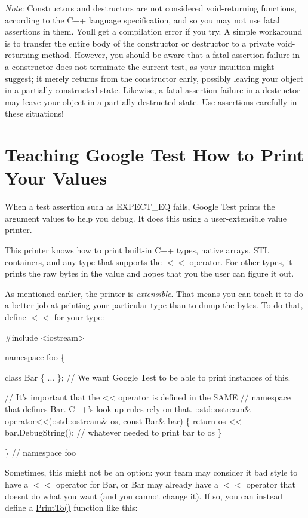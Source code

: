 {\itshape Note}\+: Constructors and destructors are not considered void-\/returning functions, according to the C++ language specification, and so you may not use fatal assertions in them. You\textquotesingle{}ll get a compilation error if you try. A simple workaround is to transfer the entire body of the constructor or destructor to a private void-\/returning method. However, you should be aware that a fatal assertion failure in a constructor does not terminate the current test, as your intuition might suggest; it merely returns from the constructor early, possibly leaving your object in a partially-\/constructed state. Likewise, a fatal assertion failure in a destructor may leave your object in a partially-\/destructed state. Use assertions carefully in these situations!

\section*{Teaching Google Test How to Print Your Values}

When a test assertion such as {\ttfamily E\+X\+P\+E\+C\+T\+\_\+\+EQ} fails, Google Test prints the argument values to help you debug. It does this using a user-\/extensible value printer.

This printer knows how to print built-\/in C++ types, native arrays, S\+TL containers, and any type that supports the {\ttfamily $<$$<$} operator. For other types, it prints the raw bytes in the value and hopes that you the user can figure it out.

As mentioned earlier, the printer is {\itshape extensible}. That means you can teach it to do a better job at printing your particular type than to dump the bytes. To do that, define {\ttfamily $<$$<$} for your type\+:


\begin{DoxyCode}
#include <iostream>

namespace foo \{

class Bar \{ ... \};  // We want Google Test to be able to print instances of this.

// It's important that the << operator is defined in the SAME
// namespace that defines Bar.  C++'s look-up rules rely on that.
::std::ostream& operator<<(::std::ostream& os, const Bar& bar) \{
  return os << bar.DebugString();  // whatever needed to print bar to os
\}

\}  // namespace foo
\end{DoxyCode}


Sometimes, this might not be an option\+: your team may consider it bad style to have a {\ttfamily $<$$<$} operator for {\ttfamily Bar}, or {\ttfamily Bar} may already have a {\ttfamily $<$$<$} operator that doesn\textquotesingle{}t do what you want (and you cannot change it). If so, you can instead define a {\ttfamily \hyperlink{namespacetesting_1_1internal_a8fd10cc30084c36a89c74868c8bd53f8}{Print\+To()}} function like this\+:


